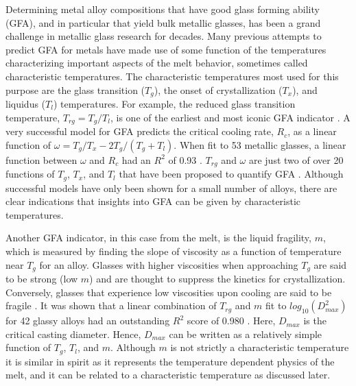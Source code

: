 \documentclass[11pt,a4paper]{article}                                %
\begin{document}
\par
Determining metal alloy compositions that have good glass forming ability (GFA), and in particular that yield bulk metallic glasses, has been a grand challenge in metallic glass research for decades. Many previous attempts to predict GFA for metals have made use of some function of the temperatures characterizing important aspects of the melt behavior, sometimes called characteristic temperatures. The characteristic temperatures most used for this purpose are the glass transition ($T_{g}$), the onset of crystallization ($T_{x}$), and liquidus ($T_{l}$) temperatures. For example, the reduced glass transition temperature, $T_{rg}=T_{g}/T_{l}$, is one of the earliest and most iconic GFA indicator \cite{Turnbull1969}. A very successful model for GFA predicts the critical cooling rate, $R_{c}$, as a linear function of $\omega=T_{g}/T_{x}-2T_{g}/(T_{g}+T_{l})$. When fit to 53 metallic glasses, a linear function between $\omega$ and $R_{c}$ had an $R^{2}$ of 0.93 \cite{Long2009}. $T_{rg}$ and $\omega$ are just two of over 20 functions of $T_{g}$, $T_{x}$, and $T_{l}$ that have been proposed to quantify GFA \cite{Deng2020, Xiong2019}. Although successful models have only been shown for a small number of alloys, there are clear indications that insights into GFA can be given by characteristic temperatures.

\par
Another GFA indicator, in this case from the melt, is the liquid fragility, $m$, which is measured by finding the slope of viscosity as a function of temperature near $T_{g}$ for an alloy. Glasses with higher viscosities when approaching $T_{g}$ are said to be strong (low $m$) and are thought to suppress the kinetics for crystallization. Conversely, glasses that experience low viscosities upon cooling are said to be fragile \cite{Dai2019-2, Jaiswal2016}. It was shown that a linear combination of $T_{rg}$ and $m$ fit to $log_{10}(D_{max}^{2})$ for 42 glassy alloys had an outstanding $R^{2}$ score of 0.980 \cite{Johnson2016}. Here, $D_{max}$ is the critical casting diameter. Hence, $D_{max}$ can be written as a relatively simple function of $T_{g}$, $T_{l}$, and $m$. Although $m$ is not strictly a characteristic temperature it is similar in spirit as it represents the temperature dependent physics of the melt, and it can be related to a characteristic temperature as discussed later.
\end{document}
